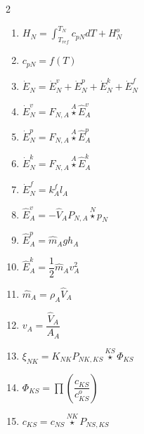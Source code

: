 \documentclass[10pt,a4paper]{report}
\begin{document}
\begin{multicols}{2}
\begin{enumerate}
		\item $H_N = \int_{T_{ref}}^{T_N} c_{pN} dT + H^o_N$
		\item $c_{pN} = f(T)$		
		\item $\dot{E}_N = \dot{E}^{v}_N + \dot{E}^{p}_N + \dot{E}^{k}_N + \dot{E}^{f}_N$
		\item $\dot{E}^{v}_N = F_{N,A} \overset{A}{\star} \hat{E}^{v}_{A}$
		\item $\dot{E}^{p}_N = F_{N,A} \overset{A}{\star} \hat{E}^{p}_{A}$
		\item $\dot{E}^{k}_N = F_{N,A} \overset{A}{\star} \hat{E}^{k}_{A}$
		\item $\dot{E}^{f}_N = k^{f}_A l_A$
		\item $\hat{E}^{v}_{A} = -\hat{V}_{A} P_{N,A} \overset{N}{\star} p_N$
		\item $\hat{E}^{p}_{A} = \hat{m}_A g h_A$
		\item $\hat{E}^{k}_{A} = \dfrac{1}{2} \hat{m}_A v_A^2$		
		\item $\hat{m}_A = \rho_A \hat{V}_{A}$
		\item $v_A = \dfrac{\hat{V}_{A}}{A_A} $	
		\item $\xi_{NK} = K_{NK} P_{NK, KS} \overset{KS}{\star} \Phi_{KS}$
		\item $\Phi_{KS} = \prod \left( \dfrac{c_{KS}}{c^{o}_{KS}} \right) $
		\item $c_{KS} = c_{NS} \overset{NK}{\star} P_{NS, KS}$	
	\end{enumerate}
\end{multicols}	
\end{document}

